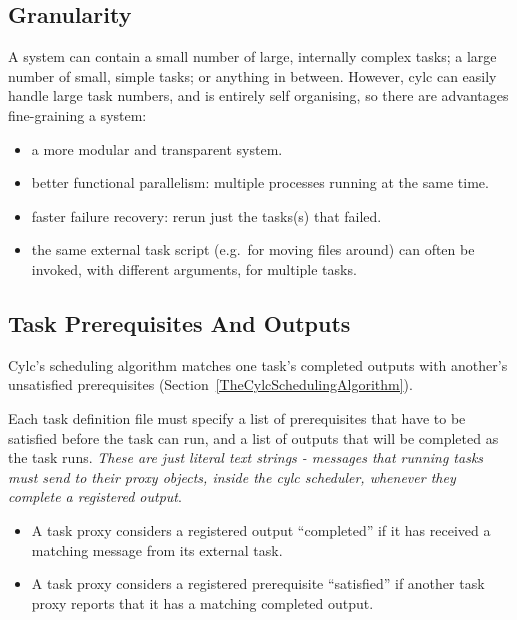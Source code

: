 \documentclass[11pt,a4paper]{article}
\begin{document}
\subsection{Granularity} 
\label{Granularity}

A system can contain a small number of large, internally complex tasks;
a large number of small, simple tasks; or anything in between. However,
cylc can easily handle large task numbers, and is entirely self
organising, so there are advantages fine-graining a system:

\begin{itemize}
    \item a more modular and transparent system.

    \item better functional parallelism: multiple processes running
        at the same time.

    \item faster failure recovery: rerun just the tasks(s) that failed. 

    \item the same external task script (e.g.\ for moving files around)
        can often be invoked, with different arguments, for multiple
        tasks.

\end{itemize}



\subsection{Task Prerequisites And Outputs}
\label{TaskPrerequisitesAndOutputs}

Cylc's scheduling algorithm matches one task's completed outputs with
another's unsatisfied prerequisites
(Section~\ref{TheCylcSchedulingAlgorithm}).  

Each task definition file must specify a list of prerequisites that have
to be satisfied before the task can run, and a list of outputs that will
be completed as the task runs. {\em These are just literal text
strings - messages that running tasks must send to their proxy objects,
inside the cylc scheduler, whenever they complete a registered output}.

\begin{itemize}
    \item A task proxy considers a registered output ``completed''
        if it has received a matching message from its external task.

    \item A task proxy considers a registered prerequisite ``satisfied''
        if another task proxy reports that it has a matching completed
        output.

\end{itemize}
\end{document}

